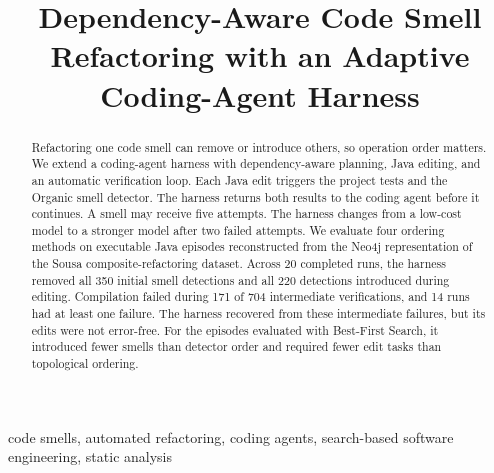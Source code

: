 \documentclass[conference]{IEEEtran}
\begin{document}
\title{\vspace*{1cm} Dependency-Aware Code Smell Refactoring with an Adaptive Coding-Agent Harness}

\author{
\and
{}
}

\maketitle

\begin{abstract}
Refactoring one code smell can remove or introduce others, so operation order
matters. We extend a coding-agent harness with dependency-aware planning,
Java editing, and an automatic verification loop. Each Java edit triggers the
project tests and the Organic smell detector. The harness returns both results
to the coding agent before it continues. A smell may receive five attempts. The
harness changes from a low-cost model to a stronger model after two failed
attempts. We evaluate four ordering methods on executable Java episodes
reconstructed from the Neo4j representation of the Sousa composite-refactoring
dataset. Across 20 completed runs, the harness removed all 350
initial smell detections and all 220 detections introduced during editing.
Compilation failed during 171 of 704 intermediate verifications, and 14 runs
had at least one failure. The harness recovered from these intermediate
failures, but its edits were not error-free. For the episodes evaluated with
Best-First Search, it
introduced fewer smells than detector order and required fewer edit tasks than
topological ordering.
\end{abstract}

\begin{IEEEkeywords}
code smells, automated refactoring, coding agents, search-based software
engineering, static analysis
\end{IEEEkeywords}
\end{document}
